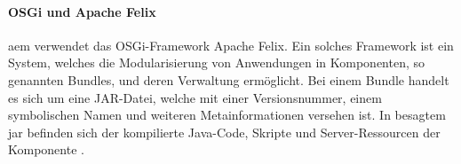 \paragraph{OSGi und Apache Felix}
\ac{aem} verwendet das OSGi-Framework Apache Felix. Ein solches Framework ist ein System, welches die Modularisierung von Anwendungen in Komponenten, so genannten Bundles, und deren Verwaltung ermöglicht. Bei einem Bundle handelt es sich um eine JAR-Datei, welche mit einer Versionsnummer, einem symbolischen Namen und weiteren Metainformationen versehen ist. In besagtem \ac{jar} befinden sich der kompilierte Java-Code, Skripte und Server-Ressourcen der Komponente \cite[S. 2-6 f.]{Incorporated2015}.